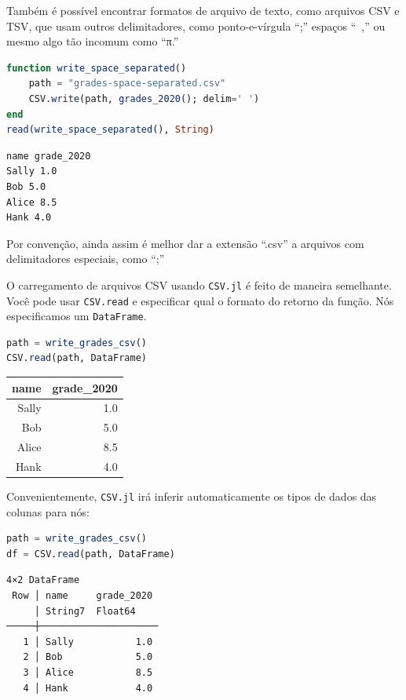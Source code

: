 \documentclass[
  notoc %
]{tufte-book}
\newcommand{\passthrough}[1]{#1}
\begin{document}
Também é possível encontrar formatos de arquivo de texto, como arquivos
CSV e TSV, que usam outros delimitadores, como ponto-e-vírgula ``;''
espaços ``~,'' ou mesmo algo tão incomum como ``π.''

\begin{lstlisting}[language=Julia]
function write_space_separated()
    path = "grades-space-separated.csv"
    CSV.write(path, grades_2020(); delim=' ')
end
read(write_space_separated(), String)
\end{lstlisting}

\begin{lstlisting}[language=Output]
name grade_2020
Sally 1.0
Bob 5.0
Alice 8.5
Hank 4.0

\end{lstlisting}

Por convenção, ainda assim é melhor dar a extensão ``.csv'' a arquivos
com delimitadores especiais, como ``;''

O carregamento de arquivos CSV usando \passthrough{\lstinline!CSV.jl!} é
feito de maneira semelhante. Você pode usar
\passthrough{\lstinline!CSV.read!} e especificar qual o formato do
retorno da função. Nós especificamos um
\passthrough{\lstinline!DataFrame!}.

\begin{lstlisting}[language=Julia]
path = write_grades_csv()
CSV.read(path, DataFrame)
\end{lstlisting}

\begin{longtable}[]{@{}rr@{}}
\toprule
name & grade\_2020 \\
\midrule
\endhead
Sally & 1.0 \\
Bob & 5.0 \\
Alice & 8.5 \\
Hank & 4.0 \\
\bottomrule
\end{longtable}

Convenientemente, \passthrough{\lstinline!CSV.jl!} irá inferir
automaticamente os tipos de dados das colunas para nós:

\begin{lstlisting}[language=Julia]
path = write_grades_csv()
df = CSV.read(path, DataFrame)
\end{lstlisting}

\begin{lstlisting}[language=Output]
4×2 DataFrame
 Row │ name     grade_2020
     │ String7  Float64
─────┼─────────────────────
   1 │ Sally           1.0
   2 │ Bob             5.0
   3 │ Alice           8.5
   4 │ Hank            4.0
\end{lstlisting}
\end{document}
